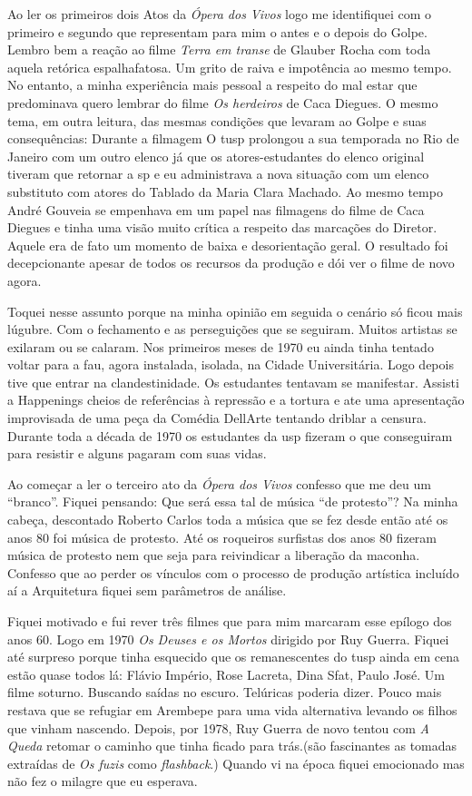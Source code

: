 Ao ler os primeiros dois Atos da {\it Ópera dos Vivos} logo me
identifiquei com o primeiro e segundo que representam para mim o antes e
o depois do Golpe. Lembro bem a reação ao filme {\it Terra em transe} de
Glauber Rocha com toda aquela retórica espalhafatosa. Um grito de raiva
e impotência ao mesmo tempo. No entanto, a minha experiência mais
pessoal a respeito do mal estar que predominava quero lembrar do filme
{\it Os herdeiros} de Caca Diegues. O mesmo tema, em outra leitura, das
mesmas condições que levaram ao Golpe e suas consequências: Durante a
filmagem O {\sc tusp} prolongou a sua temporada no Rio de Janeiro com um outro
elenco já que os atores-estudantes do elenco original tiveram que
retornar a {\sc sp} e eu administrava a nova situação com um elenco substituto
com atores do Tablado da Maria Clara Machado. Ao mesmo tempo André
Gouveia se empenhava em um papel nas filmagens do filme de Caca Diegues
e tinha uma visão muito crítica a respeito das marcações do Diretor.
Aquele era de fato um momento de baixa e desorientação geral. O
resultado foi decepcionante apesar de todos os recursos da produção e
dói ver o filme de novo agora.

Toquei nesse assunto porque na minha opinião em seguida o cenário só
ficou mais lúgubre. Com o fechamento e as perseguições que se seguiram.
Muitos artistas se exilaram ou se calaram. Nos primeiros meses de 1970
eu ainda tinha tentado voltar para a {\sc fau}, agora instalada, isolada, na
Cidade Universitária. Logo depois tive que entrar na clandestinidade. Os
estudantes tentavam se manifestar. Assisti a Happenings cheios de
referências à repressão e a tortura e ate uma apresentação improvisada
de uma peça da Comédia DellArte tentando driblar a censura. Durante toda
a década de 1970 os estudantes da {\sc usp} fizeram o que conseguiram para
resistir e alguns pagaram com suas vidas.

Ao começar a ler o terceiro ato da {\it Ópera dos Vivos} confesso que me
deu um “branco”. Fiquei pensando: Que será essa tal de música “de
protesto”? Na minha cabeça, descontado Roberto Carlos toda a música que
se fez desde então até os anos 80 foi música de protesto. Até os
roqueiros surfistas dos anos 80 fizeram música de protesto nem que seja
para reivindicar a liberação da maconha. Confesso que ao perder os
vínculos com o processo de produção artística incluído aí a Arquitetura
fiquei sem parâmetros de análise.

Fiquei motivado e fui rever três filmes que para mim marcaram esse
epílogo dos anos 60. Logo em 1970 {\it Os Deuses e os Mortos} dirigido
por Ruy Guerra. Fiquei até surpreso porque tinha esquecido que os
remanescentes do {\sc tusp} ainda em cena estão quase todos lá: Flávio
Império, Rose Lacreta, Dina Sfat, Paulo José. Um filme soturno. Buscando
saídas no escuro. Telúricas poderia dizer. Pouco mais restava que se
refugiar em Arembepe para uma vida alternativa levando os filhos que
vinham nascendo. Depois, por 1978, Ruy Guerra de novo tentou com {\it A
Queda} retomar o caminho que tinha ficado para trás.(são fascinantes as
tomadas extraídas de {\it Os fuzis} como {\it flashback}.) Quando vi na
época fiquei emocionado mas não fez o milagre que eu esperava.

